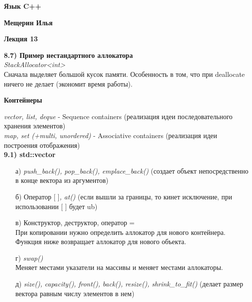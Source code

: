 \documentclass{article}
\begin{document}
	
\begin{center}
	\begin{LARGE}
		\textbf{Язык C++}
	\end{LARGE}
\end{center}
\begin{center}
	\begin{normalsize}
		\textbf{Мещерин Илья}
	\end{normalsize}
\end{center}
\begin{center}
	\begin{Large}
		\textbf{Лекция 13}
	\end{Large}
\end{center}

\noindent \textbf{8.7) Пример нестандартного аллокатора} \\
\textit{StackAllocator<int>} \\
Сначала выделяет большой кусок памяти. Особенность в том, что при deallocate ничего не делает (экономит время работы). 

\begin{center}
	\begin{large}
		\textbf{Контейнеры}
	\end{large}
\end{center}


\noindent \textit{vector, list, deque} - Sequence containers (реализация идеи последовательного хранения элементов)\\
\textit{map, set (+multi, unordered)} - Associative containers (реализация идеи построения отображения)\\
\textbf{9.1) std::vector}
\begin{itemize}

	\item[а)] 
\textit{push\_back(), pop\_back(), emplace\_back()} (создает объект непосредственно в конце вектора из аргументов)\\
	
	\item[б)] Оператор {[ ]}\textit{, at()} (если вышли за границы, то кинет исключение, при использовании [ ] будет ub)

	\item[в)] Конструктор, деструктор, оператор =\\
При копировании нужно определить аллокатор для нового контейнера. Функция ниже возвращает аллокатор для нового объекта.

	\item[г)] \textit{swap()}\\
Меняет местами указатели на массивы и меняет местами аллокаторы.
	\item[д)] \textit{size(), capacity(), front(), back(), resize(), shrink\_to\_fit()} (делает размер вектора равным числу элементов в нем)
\end{itemize}
\end{document}
